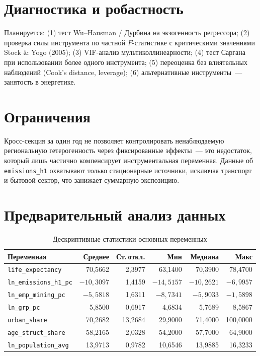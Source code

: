 \documentclass[10pt,a4paper]{article}
\begin{document}
\section*{Диагностика и робастность}

Планируется: (1) тест Wu--Hausman / Дурбина на экзогенность регрессора; (2) проверка силы инструмента по частной $F$-статистике с критическими значениями Stock \& Yogo (2005); (3) VIF-анализ мультиколлинеарности; (4) тест Саргана при использовании более одного инструмента; (5) переоценка без влиятельных наблюдений (Cook's distance, leverage); (6) альтернативные инструменты~--- занятость в энергетике.

\section*{Ограничения}

Кросс-секция за один год не позволяет контролировать ненаблюдаемую региональную гетерогенность через фиксированные эффекты~--- это недостаток, который лишь частично компенсирует инструментальная переменная. Данные об \texttt{emissions\_h1} охватывают только стационарные источники, исключая транспорт и бытовой сектор, что занижает суммарную экспозицию.

\section*{Предварительный анализ данных}

\begin{table}[H]
\centering
\caption{Дескриптивные статистики основных переменных}
\label{tab:desc}
\begin{tabular}{lrrrrr}
\toprule
\textbf{Переменная} & \textbf{Среднее} & \textbf{Ст.\,откл.} & \textbf{Мин} & \textbf{Медиана} & \textbf{Макс} \\
\midrule
\texttt{life\_expectancy}    & 70{,}5662  & 2{,}3977  & 63{,}1400   & 70{,}3900  & 78{,}4700 \\
\texttt{ln\_emissions\_h1\_pc} & $-10{,}3097$ & 1{,}4159 & $-14{,}5157$ & $-10{,}2621$ & $-6{,}9957$ \\
\texttt{ln\_emp\_mining\_pc}  & $-5{,}5818$  & 1{,}6311 & $-8{,}7341$  & $-5{,}9033$  & $-1{,}5898$ \\
\texttt{ln\_grp\_pc}          & 5{,}8500   & 0{,}6917  & 4{,}6834    & 5{,}7689   & 8{,}5867 \\
\texttt{urban\_share}        & 70{,}2682  & 13{,}2684 & 29{,}9000   & 71{,}4000  & 100{,}0000 \\
\texttt{age\_struct\_share}  & 58{,}2165  & 2{,}0328  & 54{,}2000   & 57{,}7000  & 64{,}9000 \\
\texttt{ln\_population\_avg} & 13{,}9713  & 0{,}9782  & 10{,}6546   & 13{,}9885  & 16{,}3233 \\
\bottomrule
\end{tabular}
\end{table}
\end{document}
